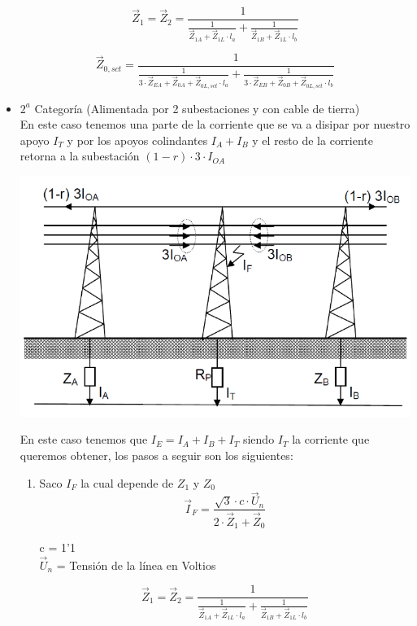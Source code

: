\documentclass[10pt,a4paper]{article}
\begin{document}
\begin{itemize}
    $$
    \vec{Z}_{1}=\vec{Z}_{2}=\frac{1}{\frac{1}{\vec{Z}_{1A}+\vec{Z}_{1 L} \cdot l_{a}}+\frac{1}{\vec{Z}_{1B}+\vec{Z}_{1 L} \cdot l_{b}}}
    $$
    
    $$
    \vec{Z}_{0, s c t}=\frac{1}{\frac{1}{3 \cdot \vec{Z}_{E A}+\vec{Z}_{0 A}+\vec{Z}_{0 L, s c t} \cdot l_{a}}+\frac{1}{3 \cdot \vec{Z}_{E B}+\vec{Z}_{0 B}+\vec{Z}_{0 L, s c t} \cdot l_{b}}}
    $$
    \item $2^a$ Categoría (Alimentada por 2 subestaciones y con cable de tierra)
    \\
    
    En este caso tenemos una parte de la corriente que se va a disipar por nuestro apoyo $I_T$ y por los apoyos colindantes $I_A + I_B$ y el resto de la corriente retorna a la subestación $(1 - r)\cdot3\cdot I_{OA}$ 
    \begin{center}
        \includegraphics[scale = 0.6]{assets/100.png}
    \end{center}
    En este caso tenemos que $I_E = I_A + I_B + I_T$ siendo $I_T$ la corriente que queremos obtener, los pasos a seguir son los siguientes:
    \begin{enumerate}
        \item Saco $I_F$ la cual depende de $Z_1$ y $Z_0$
        $$
        \vec{I}_{F}=\frac{\sqrt{3} \cdot c \cdot \vec{U}_{n}}{2 \cdot \vec{Z}_{1}+\vec{Z}_{0}}
        $$
        
        c = 1'1 \\
        $\vec{U}_{n}$ = Tensión de la línea en Voltios
        
        
        $$
        \vec{Z}_{1}=\vec{Z}_{2}=\frac{1}{\frac{1}{\vec{Z}_{1A}+\vec{Z}_{1 L} \cdot l_{a}}+\frac{1}{\vec{Z}_{1B}+\vec{Z}_{1 L} \cdot l_{b}}}
        $$
        

\end{enumerate}
\end{itemize}
\end{document}
